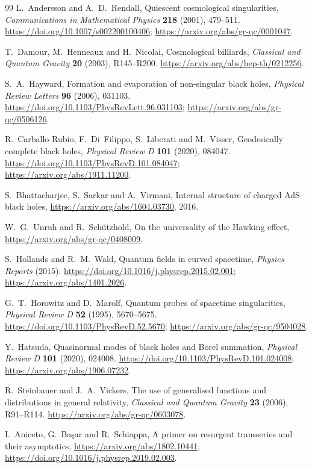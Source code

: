 \documentclass[11pt,letterpaper]{article}
\numberwithin{equation}{section}
\theoremstyle{definition}
\theoremstyle{remark}
\begin{document}
\begin{thebibliography}{99}
L.~Andersson and A.~D.~Rendall, Quiescent cosmological singularities,
\emph{Communications in Mathematical Physics} \textbf{218} (2001), 479--511.
\url{https://doi.org/10.1007/s002200100406};
\url{https://arxiv.org/abs/gr-qc/0001047}.

T.~Damour, M.~Henneaux and H.~Nicolai, Cosmological billiards, \emph{Classical
and Quantum Gravity} \textbf{20} (2003), R145--R200.
\url{https://arxiv.org/abs/hep-th/0212256}.

S.~A.~Hayward, Formation and evaporation of non-singular black holes,
\emph{Physical Review Letters} \textbf{96} (2006), 031103.
\url{https://doi.org/10.1103/PhysRevLett.96.031103};
\url{https://arxiv.org/abs/gr-qc/0506126}.

R.~Carballo-Rubio, F.~Di~Filippo, S.~Liberati and M.~Visser, Geodesically
complete black holes, \emph{Physical Review D} \textbf{101} (2020), 084047.
\url{https://doi.org/10.1103/PhysRevD.101.084047};
\url{https://arxiv.org/abs/1911.11200}.

S.~Bhattacharjee, S.~Sarkar and A.~Virmani, Internal structure of charged AdS
black holes, \url{https://arxiv.org/abs/1604.03730}, 2016.

W.~G.~Unruh and R.~Sch\"utzhold, On the universality of the Hawking effect,
\url{https://arxiv.org/abs/gr-qc/0408009}.

S.~Hollands and R.~M.~Wald, Quantum fields in curved spacetime, \emph{Physics
Reports} (2015). \url{https://doi.org/10.1016/j.physrep.2015.02.001};
\url{https://arxiv.org/abs/1401.2026}.

G.~T.~Horowitz and D.~Marolf, Quantum probes of spacetime singularities,
\emph{Physical Review D} \textbf{52} (1995), 5670--5675.
\url{https://doi.org/10.1103/PhysRevD.52.5670};
\url{https://arxiv.org/abs/gr-qc/9504028}.

Y.~Hatsuda, Quasinormal modes of black holes and Borel summation,
\emph{Physical Review D} \textbf{101} (2020), 024008.
\url{https://doi.org/10.1103/PhysRevD.101.024008};
\url{https://arxiv.org/abs/1906.07232}.

R.~Steinbauer and J.~A.~Vickers, The use of generalised functions and
distributions in general relativity, \emph{Classical and Quantum Gravity}
\textbf{23} (2006), R91--R114. \url{https://arxiv.org/abs/gr-qc/0603078}.

I.~Aniceto, G.~Ba\c{s}ar and R.~Schiappa, A primer on resurgent transseries and
their asymptotics, \url{https://arxiv.org/abs/1802.10441};
\url{https://doi.org/10.1016/j.physrep.2019.02.003}.


\end{thebibliography}
\end{document}
